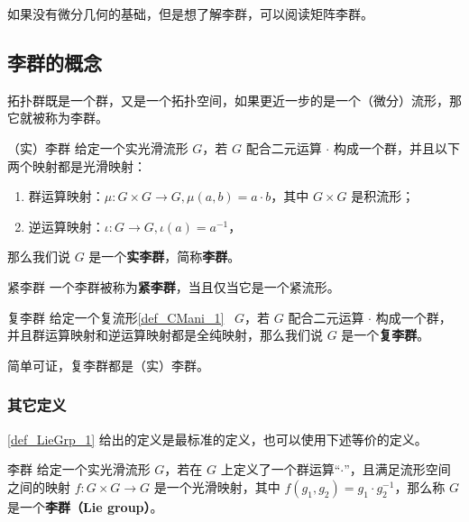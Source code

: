 

如果没有微分几何的基础，但是想了解李群，可以阅读矩阵李群。

\subsection{李群的概念}

拓扑群既是一个群，又是一个拓扑空间，如果更近一步的是一个（微分）流形，那它就被称为李群。
\begin{definition}{（实）李群}\label{def_LieGrp_1}
给定一个实光滑流形 $G$，若 $G$ 配合二元运算 $\cdot$ 构成一个群，并且以下两个映射都是光滑映射：
\begin{enumerate}
\item 群运算映射：$\mu:G\times G\to G, \mu(a,b)=a\cdot b$，其中 $G\times G$ 是积流形；
\item 逆运算映射：$\iota:G\to G, \iota(a)=a^{-1}$，
\end{enumerate}
那么我们说 $G$ 是一个\textbf{实李群}，简称\textbf{李群}。
\end{definition}

\begin{definition}{紧李群}
一个李群被称为\textbf{紧李群}，当且仅当它是一个紧流形。
\end{definition}

\begin{definition}{复李群}\label{def_LieGrp_6}
给定一个复流形\autoref{def_CMani_1}~ $G$，若 $G$ 配合二元运算 $\cdot$ 构成一个群，并且群运算映射和逆运算映射都是全纯映射，那么我们说 $G$ 是一个\textbf{复李群}。
\end{definition}
简单可证，复李群都是（实）李群。


\subsubsection{其它定义}

\autoref{def_LieGrp_1} 给出的定义是最标准的定义，也可以使用下述等价的定义。

\begin{definition}{李群}\label{def_LieGrp_3}
给定一个实光滑流形 $G$，若在 $G$ 上定义了一个群运算“$\cdot$”，且满足流形空间之间的映射 $f:G\times G\rightarrow G$ 是一个光滑映射，其中 $f(g_1, g_2)=g_1\cdot g_2^{-1}$，那么称 $G$ 是一个\textbf{李群（Lie group）}。
\end{definition}

